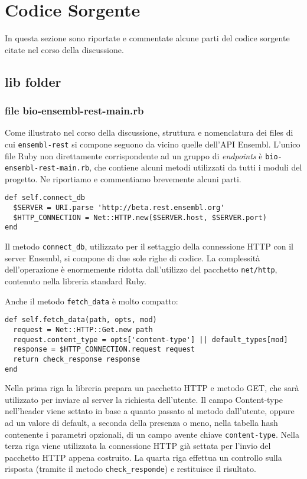 \chapter{Codice Sorgente}

In questa sezione sono riportate e commentate alcune parti del codice sorgente citate nel corso della discussione.

\section*{lib folder}
\label{app:lib}

\subsection*{file bio-ensembl-rest-main.rb}

Come illustrato nel corso della discussione, struttura e nomenclatura dei files di cui \texttt{ensembl-rest} si compone seguono da vicino quelle dell'API Ensembl. L'unico file Ruby non direttamente corrispondente ad un gruppo di \emph{endpoints} è \texttt{bio-ensembl-rest-main.rb}, che contiene alcuni metodi utilizzati da tutti i moduli del progetto. Ne riportiamo e commentiamo brevemente alcuni parti.

\begin{verbatim}
def self.connect_db
  $SERVER = URI.parse 'http://beta.rest.ensembl.org'
  $HTTP_CONNECTION = Net::HTTP.new($SERVER.host, $SERVER.port)
end
\end{verbatim}
Il metodo \texttt{connect\_db}, utilizzato per il settaggio della connessione HTTP con il server Ensembl, si compone di due sole righe di codice. La complessità dell'operazione è enormemente ridotta dall'utilizzo del pacchetto \texttt{net/http}, contenuto nella libreria standard Ruby.

Anche il metodo \texttt{fetch\_data} è molto compatto:
\begin{verbatim}
def self.fetch_data(path, opts, mod)
  request = Net::HTTP::Get.new path
  request.content_type = opts['content-type'] || default_types[mod]
  response = $HTTP_CONNECTION.request request
  return check_response response
end
\end{verbatim} 
Nella prima riga la libreria prepara un pacchetto HTTP e metodo GET, che sarà utilizzato per inviare al server la richiesta dell'utente. Il campo Content-type nell'header viene settato in base a quanto passato al metodo dall'utente, oppure ad un valore di default, a seconda della presenza o meno, nella tabella hash contenente i parametri opzionali, di un campo avente chiave \texttt{content-type}. Nella terza riga viene utilizzata la connessione HTTP già settata per l'invio del pacchetto HTTP appena costruito. La quarta riga effettua un controllo sulla risposta (tramite il metodo \texttt{check\_responde}) e restituisce il risultato.

